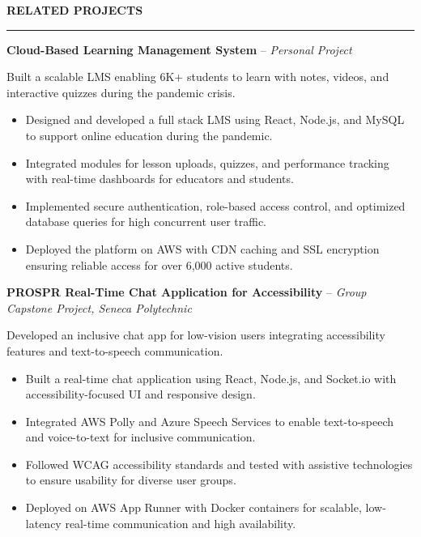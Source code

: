 \documentclass[10pt,letterpaper]{article}
\begin{document}
\vspace{6pt}

\textbf{RELATED PROJECTS}\\[-8pt]
\noindent\rule{\textwidth}{1pt}

\vspace{-2pt}

\textbf{Cloud-Based Learning Management System} -- \emph{Personal Project}

\vspace{-1pt}

Built a scalable LMS enabling 6K+ students to learn with notes, videos, and interactive quizzes during the pandemic crisis.
\vspace{-1pt}
\begin{itemize}
\item Designed and developed a full stack LMS using React, Node.js, and MySQL to support online education during the pandemic.
\item Integrated modules for lesson uploads, quizzes, and performance tracking with real-time dashboards for educators and students.
\item Implemented secure authentication, role-based access control, and optimized database queries for high concurrent user traffic.
\item Deployed the platform on AWS with CDN caching and SSL encryption ensuring reliable access for over 6,000 active students.
\end{itemize}

\textbf{PROSPR  Real-Time Chat Application for Accessibility} -- \emph{Group Capstone Project, Seneca Polytechnic}

\vspace{-1pt}

Developed an inclusive chat app for low-vision users integrating accessibility features and text-to-speech communication.
\vspace{-1pt}
\begin{itemize}
\item Built a real-time chat application using React, Node.js, and Socket.io with accessibility-focused UI and responsive design.
\item Integrated AWS Polly and Azure Speech Services to enable text-to-speech and voice-to-text for inclusive communication.
\item Followed WCAG accessibility standards and tested with assistive technologies to ensure usability for diverse user groups.
\item Deployed on AWS App Runner with Docker containers for scalable, low-latency real-time communication and high availability.
\end{itemize}
\end{document}

